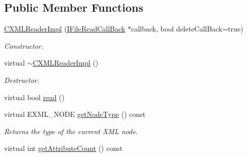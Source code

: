 \subsection*{Public Member Functions}
\begin{DoxyCompactItemize}
\item 
\hypertarget{classirr_1_1io_1_1_c_x_m_l_reader_impl_a0566f930b8accdcdd4714f4b850f8a76}{\hyperlink{classirr_1_1io_1_1_c_x_m_l_reader_impl_a0566f930b8accdcdd4714f4b850f8a76}{C\+X\+M\+L\+Reader\+Impl} (\hyperlink{classirr_1_1io_1_1_i_file_read_call_back}{I\+File\+Read\+Call\+Back} $\ast$callback, bool delete\+Call\+Back=true)}\label{classirr_1_1io_1_1_c_x_m_l_reader_impl_a0566f930b8accdcdd4714f4b850f8a76}

\begin{DoxyCompactList}\small\item\em Constructor. \end{DoxyCompactList}\item 
\hypertarget{classirr_1_1io_1_1_c_x_m_l_reader_impl_a5306b209d836775bc2c5c286314c7e20}{virtual \hyperlink{classirr_1_1io_1_1_c_x_m_l_reader_impl_a5306b209d836775bc2c5c286314c7e20}{$\sim$\+C\+X\+M\+L\+Reader\+Impl} ()}\label{classirr_1_1io_1_1_c_x_m_l_reader_impl_a5306b209d836775bc2c5c286314c7e20}

\begin{DoxyCompactList}\small\item\em Destructor. \end{DoxyCompactList}\item 
virtual bool \hyperlink{classirr_1_1io_1_1_c_x_m_l_reader_impl_abc3c451a40c816ce74c846ebc2e71417}{read} ()
\item 
\hypertarget{classirr_1_1io_1_1_c_x_m_l_reader_impl_a307110843c6946fa862da1f46244aecd}{virtual E\+X\+M\+L\+\_\+\+N\+O\+D\+E \hyperlink{classirr_1_1io_1_1_c_x_m_l_reader_impl_a307110843c6946fa862da1f46244aecd}{get\+Node\+Type} () const }\label{classirr_1_1io_1_1_c_x_m_l_reader_impl_a307110843c6946fa862da1f46244aecd}

\begin{DoxyCompactList}\small\item\em Returns the type of the current X\+M\+L node. \end{DoxyCompactList}\item 
\hypertarget{classirr_1_1io_1_1_c_x_m_l_reader_impl_a0e8003aa93f362dd118c735d8a98e8d5}{virtual int \hyperlink{classirr_1_1io_1_1_c_x_m_l_reader_impl_a0e8003aa93f362dd118c735d8a98e8d5}{get\+Attribute\+Count} () const }\label{classirr_1_1io_1_1_c_x_m_l_reader_impl_a0e8003aa93f362dd118c735d8a98e8d5}


\end{DoxyCompactItemize}
